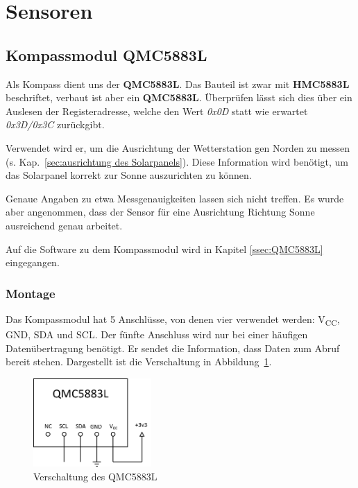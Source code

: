 \section{Sensoren}\label{sec:Sensoren}




\subsection{Kompassmodul QMC5883L}
Als Kompass dient uns der \textbf{QMC5883L}. Das Bauteil ist zwar mit \textbf{HMC5883L} beschriftet, verbaut ist aber ein \textbf{QMC5883L}. Überprüfen lässt sich dies über ein Auslesen der Registeradresse, welche den Wert \textit{0x0D} statt wie erwartet \textit{0x3D/0x3C} zurückgibt.

Verwendet wird er, um die Ausrichtung der Wetterstation gen Norden zu messen (s. Kap.~\ref{sec:ausrichtung des Solarpanels}). Diese Information wird benötigt, um das Solarpanel korrekt zur Sonne auszurichten zu können. 

Genaue Angaben zu etwa Messgenauigkeiten lassen sich nicht treffen. Es wurde aber angenommen, dass der Sensor für eine Ausrichtung Richtung Sonne ausreichend genau arbeitet.

Auf die Software zu dem Kompassmodul wird in Kapitel \ref{ssec:QMC5883L} eingegangen.

\subsubsection{Montage}
Das Kompassmodul hat 5 Anschlüsse, von denen vier verwendet werden: V\textsubscript{CC}, GND, SDA und SCL. Der fünfte Anschluss wird nur bei einer häufigen Datenübertragung benötigt. Er sendet die Information, dass Daten zum Abruf bereit stehen. Dargestellt ist die Verschaltung in Abbildung~\ref{fig:QMC5883L_Plan}.

\begin{figure}[H]
  \centering
  \includegraphics[width=0.4\textwidth]{./img/QMC5883L_Plan.png}
  \caption{Verschaltung des QMC5883L}\label{fig:QMC5883L_Plan}
\end{figure}

